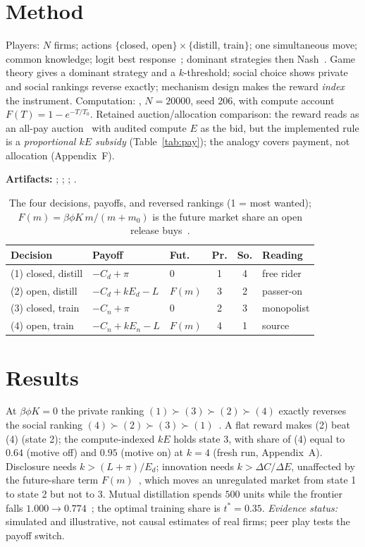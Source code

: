 \section{Method}
Players: $N$ firms; actions $\{$closed, open$\}\times\{$distill, train$\}$; one simultaneous move; common knowledge; logit best response~\cite{mckelvey1995}; dominant strategies then Nash~\cite{nash1950,selten1975,harsanyi1968}. Game theory gives a dominant strategy and a $k$-threshold; social choice shows private and social rankings reverse exactly; mechanism design makes the reward \emph{index} the instrument. Computation: , $N{=}20000$, seed 206, with compute account $F(T)=1-e^{-T/T_0}$. Retained auction/allocation comparison: the reward reads as an all-pay auction~\cite{baye1996} with audited compute $E$ as the bid, but the implemented rule is a \emph{proportional $kE$ subsidy} (Table~\ref{tab:pay}); the analogy covers payment, not allocation (Appendix~F).

\noindent\textbf{Artifacts:} \GitHubLink; \NotebookLink; \HuggingFaceLink; \PosterLink.

\begin{table}[h]\caption{The four decisions, payoffs, and reversed rankings (1 = most wanted); $F(m)=\beta\phi K\,m/(m{+}m_0)$ is the future market share an open release buys~\cite{habibi2025,xu2025}.}
\label{tab:four}
\footnotesize\setlength{\tabcolsep}{3pt}\renewcommand{\arraystretch}{1.0}
\begin{tabularx}{\columnwidth}{@{}p{1.7cm}p{2.1cm}p{0.6cm}ccp{1.6cm}@{}}\toprule
\textbf{Decision}&\textbf{Payoff}&\textbf{Fut.}&\textbf{Pr.}&\textbf{So.}&\textbf{Reading}\\\midrule
(1) closed, distill&$-C_d+\pi$&$0$&1&4&free rider~\cite{olson1965}\\
(2) open, distill&$-C_d+kE_d-L$&$F(m)$&3&2&passer-on\\
(3) closed, train&$-C_n+\pi$&$0$&2&3&monopolist\\
(4) open, train&$-C_n+kE_n-L$&$F(m)$&4&1&source\\\bottomrule
\end{tabularx}\end{table}

\section{Results}
At $\beta\phi K=0$ the private ranking $(1)\succ(3)\succ(2)\succ(4)$ exactly reverses the social ranking $(4)\succ(2)\succ(3)\succ(1)$~\cite{arrow1962,romer1990}. A flat reward makes (2) beat (4) (state 2); the compute-indexed $kE$ holds state 3, with share of (4) equal to $0.64$ (motive off) and $0.95$ (motive on) at $k{=}4$ (fresh run, Appendix~A). Disclosure needs $k>(L+\pi)/E_d$; innovation needs $k>\Delta C/\Delta E$, unaffected by the future-share term $F(m)$~\cite{habibi2025,xu2025}, which moves an unregulated market from state 1 to state 2 but not to 3. Mutual distillation spends $500$ units while the frontier falls $1.000\to0.774$~\cite{shumailov2024}; the optimal training share is $t^\ast=0.35$. \emph{Evidence status:} simulated and illustrative, not causal estimates of real firms; peer play tests the payoff switch.

